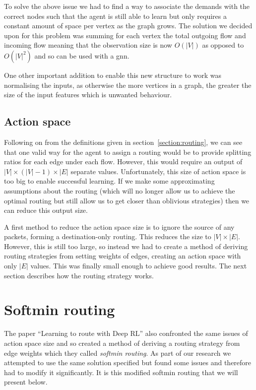 To solve the above issue we had to find a way to associate the demands with the correct nodes such that the agent is still able to learn but only requires a constant amount of space per vertex as the graph grows. The solution we decided upon for this problem was summing for each vertex the total outgoing flow and incoming flow meaning that the observation size is now $O(|V|)$ as opposed to $O(|V|^2)$ and so can be used with a \ac{gnn}.

One other important addition to enable this new structure to work was normalising the inputs, as otherwise the more vertices in a graph, the greater the size of the input features which is unwanted behaviour.

\subsection{Action space}
Following on from the definitions given in section~\ref{section:routing}, we can see that one valid way for the agent to assign a routing would be to provide splitting ratios for each edge under each flow. However, this would require an output of $|V|\times(|V|-1)\times|E|$ separate values. Unfortunately, this size of action space is too big to enable successful learning. If we make some approximating assumptions about the routing (which will no longer allow us to achieve the optimal routing but still allow us to get closer than oblivious strategies) then we can reduce this output size.

A first method to reduce the action space size is to ignore the source of any packets, forming a destination-only routing. This reduces the size to $|V|\times|E|$. However, this is still too large, so instead we had to create a method of deriving routing strategies from setting weights of edges, creating an action space with only $|E|$ values. This was finally small enough to achieve good results. The next section describes how the routing strategy works.

\section{Softmin routing}
The paper ``Learning to route with Deep RL''\cite{valadarsky2017learning} also confronted the same issues of action space size and so created a method of deriving a routing strategy from edge weights which they called \emph{softmin routing}. As part of our research we attempted to use the same solution specified but found some issues and therefore had to modify it significantly. It is this modified softmin routing that we will present below.

